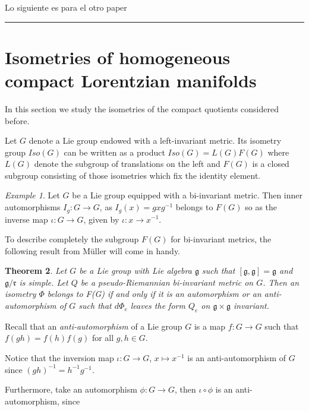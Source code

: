 \documentclass[11pt]{amsart}
\newcommand{\mgg}{\mathfrak g }
\theoremstyle{plain}
\newtheorem{thm}{Theorem}[section]
\theoremstyle{definition}
\theoremstyle{remark}
\newtheorem{exa}[thm]{Example}
\begin{document}


\newpage

{\color{red} Lo siguiente es para el otro paper  \\
\rule{\linewidth}{0.2mm} }


\section{Isometries of homogeneous compact Lorentzian manifolds}

In this section we study the isometries of the compact quotients considered before. 

Let $G$ denote a Lie group endowed with a left-invariant metric. Its isometry group $Iso(G)$ can be written as a product $Iso(G)=L(G)F(G)$ where $L(G)$ denote the subgroup of translations on the left and $F(G)$ is a closed subgroup consisting of those isometries which fix the identity element. 


\begin{exa} Let $G$ be a Lie group equipped with a bi-invariant metric. Then inner automorphisms $I_g: G\to G$, as $I_g(x)=g x g^{-1}$ belongs to $F(G)$ so as the inverse map $\iota:G \to G$, given by $\iota: x\to x^{-1}$. 
\end{exa}

 To  describe completely the subgroup  $F(G)$ for bi-invariant metrics, the following result from M\"uller \cite{MU} will come in handy. 

	
\begin{thm} \label{dm1}
Let $G$ be a Lie group with Lie algebra $\mgg$ such that $[\mgg,\mgg]=\mgg$ and $\mgg/\mathfrak{r}$ is simple. Let $Q$ be a pseudo-Riemannian bi-invariant metric on $G$.
 Then an isometry $\Phi$ belongs to  F(G) if and only if it is an automorphism or an anti-automorphism of $G$ such that $d\Phi_e$ leaves the form $Q_e$ on $\mgg \times \mgg$ invariant.

\end{thm}

Recall that an {\em anti-automorphism} of a Lie group $G$ is a map $f:G \to  G$ such that $f(g h)=f(h)f(g)$ for all $g,h\in G$.

Notice that the inversion map $\iota: G \to G$, $x \mapsto x^{-1}$ is an anti-automorphism of $G$ since $(gh)^{-1} =h^{-1} g^{-1}$. 

Furthermore, take an automorphism $\phi:G \to G$, then $\iota \circ \phi$ is an anti-automorphism, since
\end{document}
